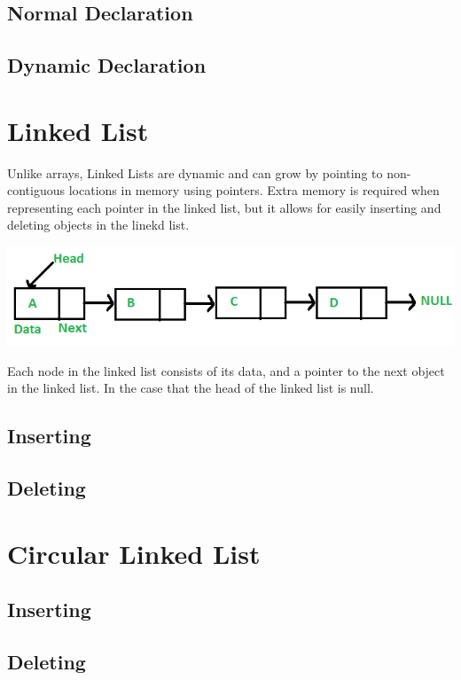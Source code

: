 \documentclass[11pt]{article}
\begin{document}
\subsection{Normal Declaration}
\subsection{Dynamic Declaration}
\section{Linked List}
Unlike arrays, Linked Lists are dynamic and can grow by pointing to non-contiguous locations in memory using pointers. Extra memory is required when representing each pointer in the linked list, but it allows for easily inserting and deleting objects in the linekd list.
\begin{center}
    \includegraphics[width=250 px]{img/linkedlist}  \\
\end{center}
Each node in the linked list consists of its data, and a pointer to the next object in the linked list. In the case that the head of the linked list is null.


\subsection{Inserting}



\subsection{Deleting}



\section{Circular Linked List}



\subsection{Inserting}



\subsection{Deleting}
\end{document}
